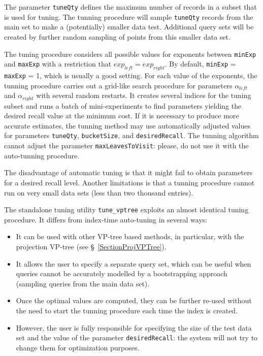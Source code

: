 \documentclass[runningheads,a4paper]{llncs}
\newcommand{\ttt}[1]{\texttt{#1}}
\begin{document}
{The parameter \texttt{tuneQty} defines the maximum number of records in a subset that is used for tuning. 
The tunning procedure will sample \texttt{tuneQty} records from the main set to make a (potentially) smaller data test. 
Additional query sets will be created by further random sampling of points from this smaller data set.

The tuning procedure considers all possible values for exponents between \ttt{minExp} and \ttt{maxExp} with 
a restriction that  $exp_{left}=exp_{right}$. 
By default, \ttt{minExp} = \ttt{maxExp} = 1, which is usually a good setting.
For each value of the exponents,
the tunning procedure carries out a grid-like search procedure for parameters $\alpha_{left}$ and $\alpha_{right}$ 
with several random restarts. 
It creates several indices for the tuning subset and runs a batch of mini-experiments to
find parameters yielding the desired recall value at the minimum cost.
If it is necessary to produce more accurate estimates, the tunning method may use automatically adjusted
values for parameters \texttt{tuneQty}, \texttt{bucketSize}, and \texttt{desiredRecall}.
The tunning algorithm cannot adjust the parameter \texttt{maxLeavesToVisit}:
please, do not use it with the auto-tunning procedure.

The disadvantage of automatic tuning is that it might fail to obtain
parameters for a desired recall level. Another limitations is that a tunning procedure cannot
run on very small data sets (less than two thousand entries).

The standalone tuning utility \texttt{tune\_vptree} exploits an almost identical tuning procedure.
It differs from index-time auto-tuning in several ways:  
\begin{itemize}
\item  It can be used with other VP-tree based methods, 
in particular, with the projection VP-tree (see \S~\ref{SectionProjVPTree}).
\item It allows the user to specify a separate query set, which can be useful
when queries cannot be accurately modelled by a bootstrapping approach (sampling queries from the main data set).
\item Once the optimal values are computed, they can be further re-used without the need
to start the tunning procedure each time the index is created.
\item However, the user is fully responsible for specifying the size of the test data set
and the value of the parameter \texttt{desiredRecall}: the system
will not try to change them for optimization purposes.
\end{itemize}

}
\end{document}
